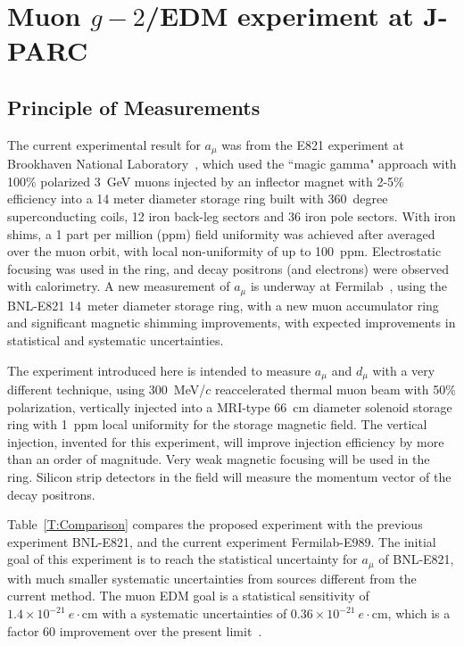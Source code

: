 \section{Muon $g-2$/EDM experiment at J-PARC}

\subsection{Principle of Measurements}\label{sec:Principle} 

The current experimental result for $a_{\mu}$ was from the E821 experiment 
at Brookhaven National Laboratory~\cite{Bennett:2006fi}, 
which used the ``magic gamma" approach with 100\% polarized 3~GeV muons 
injected by an inflector magnet with 2-5\% efficiency into a 14 meter diameter 
storage ring built with 360~degree superconducting coils, 
12 iron back-leg sectors and 36 iron pole sectors. 
With iron shims, a 1 part per million (ppm) field uniformity was achieved after
averaged over the muon orbit, with local non-uniformity of up to 100~ppm. 
Electrostatic focusing was used in the ring, and decay positrons (and electrons) 
were observed with calorimetry.  A new measurement of $a_{\mu}$ is underway 
at Fermilab~\cite{Grange:2015fou}, using the BNL-E821 14~meter diameter storage ring,
with a new muon accumulator ring and significant magnetic shimming improvements, 
with expected improvements in statistical and systematic uncertainties.

The experiment introduced here
is intended to measure $a_{\mu}$ and $d_{\mu}$ with a very different technique,
using 300~MeV/$c$ reaccelerated thermal muon beam with 50\% polarization,
vertically injected into a MRI-type 66~cm diameter solenoid storage ring 
with 1~ppm local uniformity for the storage magnetic field.
The vertical injection, invented for this experiment, 
will improve injection efficiency by more than an order of magnitude.
Very weak magnetic focusing will be used in the ring. 
Silicon strip detectors in the field will measure 
the momentum vector of the decay positrons. 

Table~\ref{T:Comparison} compares the proposed experiment with the previous
experiment BNL-E821, and the current experiment Fermilab-E989.
The initial goal of this experiment is to reach the statistical uncertainty for $a_{\mu}$ 
of BNL-E821, with much smaller systematic uncertainties from sources different from the current method.
The muon EDM goal is a statistical sensitivity of $1.4\times 10^{-21}~e\cdot\mbox{cm}$
with a systematic uncertainties of $0.36\times 10^{-21}~e\cdot\mbox{cm}$,
which is a factor 60 improvement over the present limit~\cite{Bennett:2008dy}.

